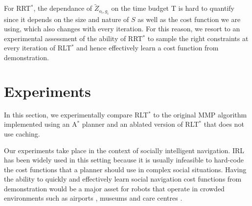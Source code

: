 \documentclass{article}  %
\begin{document}



For RRT$^*$, the dependance of $\tilde{Z}_{o_i,g_i}$ on the time budget T is hard to quantify since it depends on the size and nature of $S$ as well as the cost function we are using, which also changes with every iteration. For this reason, we resort to an experimental assessment of the ability of RRT$^*$ to sample the right constraints at every iteration of RLT$^*$ and hence effectively learn a cost function from demonstration.

\section{Experiments}

In this section, we experimentally compare RLT$^*$ to the original MMP algorithm implemented using an A$^*$ planner and an ablated version of RLT$^*$ that does not use caching.
	
	Our experiments take place in the context of socially intelligent navigation. IRL has been widely used in this setting \cite{okallearning,henry2010learning,vasquez2014inverse} because it is usually infeasible to hard-code the cost functions that a planner should use in complex social situations. Having the ability to quickly and effectively learn social navigation cost functions from demonstration would be a major asset for robots that operate in crowded environments such as airports \cite{triebel2015spencer}, museums \cite{thrun1999minerva} and care centres \cite{shiarlis2015teresa}.
	
\end{document}
